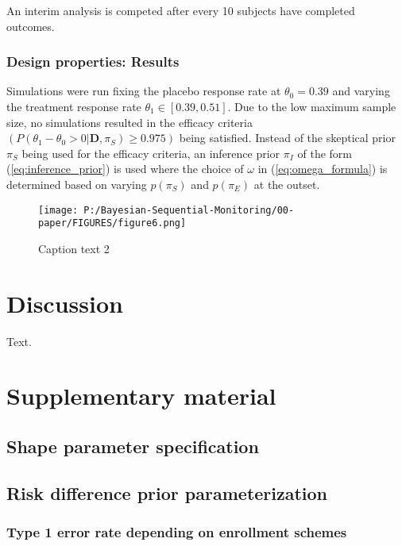 \documentclass[12pt]{article}
\begin{document}
An interim analysis is competed after every 10 subjects have completed outcomes.

\subsubsection{Design properties: Results}

Simulations were run fixing the placebo response rate at $\theta_0=0.39$ and varying the treatment response rate $\theta_1\in[0.39,0.51]$. Due to the low maximum sample size, no simulations resulted in the efficacy criteria $(P(\theta_1-\theta_0>0|\mathbf{D},\pi_S)\geq 0.975)$ being satisfied. Instead of the skeptical prior $\pi_S$ being used for the efficacy criteria, an inference prior $\pi_I$ of the form (\ref{eq:inference_prior}) is used where the choice of $\omega$ in (\ref{eq:omega_formula}) is determined based on varying $p(\pi_S)$ and $p(\pi_E)$ at the outset.

\begin{figure}
    \centering\texttt{[image: P:/Bayesian-Sequential-Monitoring/00-paper/FIGURES/figure6.png]}
    \caption{Caption text 2}
 \end{figure}


\section{Discussion}

Text.
\section{Supplementary material}
\subsection{Shape parameter specification}\label{sec:shapeParameterSpecification}
\subsection{Risk difference prior parameterization}\label{sec:riskDiffPriorParm}
\subsubsection{Type 1 error rate depending on enrollment schemes}

\newpage
\end{document}
